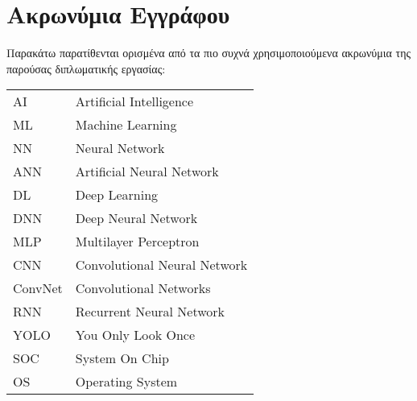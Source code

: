 \chapter*{Ακρωνύμια Εγγράφου}
\label{append:acronyms}
{}

Παρακάτω παρατίθενται ορισμένα από τα πιο συχνά χρησιμοποιούμενα ακρωνύμια της
παρούσας διπλωματικής εργασίας:

\begin{table}[htpb]
  \centering
  \begin{tabular}{l@{$\;\;\longrightarrow\;\;$}l}
    AI & Artificial Intelligence \\
    ML & Machine Learning \\
    NN & Neural Network \\
    ANN & Artificial Neural Network \\
    DL & Deep Learning \\
    DNN & Deep Neural Network \\
    MLP & Multilayer Perceptron \\
    CNN & Convolutional Neural Network \\
    ConvNet & Convolutional Networks \\
    RNN & Recurrent Neural Network \\
    YOLO & You Only Look Once \\
    SOC & System On Chip \\
    OS & Operating System
  \end{tabular}
\end{table}
